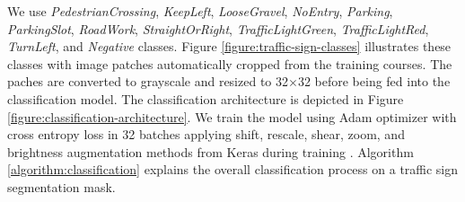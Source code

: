 We use \textit{PedestrianCrossing}, \textit{KeepLeft}, \textit{LooseGravel},
\textit{NoEntry}, \textit{Parking}, \textit{ParkingSlot}, \textit{RoadWork},
\textit{StraightOrRight}, \textit{TrafficLightGreen}, \textit{TrafficLightRed},
\textit{TurnLeft}, and \textit{Negative} classes. Figure
\ref{figure:traffic-sign-classes} illustrates these classes with image patches
automatically cropped from the training courses. The paches are converted to
grayscale and resized to 32$\times$32 before being fed into the classification
model. The classification architecture is depicted in Figure
\ref{figure:classification-architecture}. We train the model using Adam
optimizer with cross entropy loss in 32 batches applying shift, rescale, shear,
zoom, and brightness augmentation methods from Keras during
training \cite{Abadi2015TF, Chollet2015Keras}. Algorithm
\ref{algorithm:classification} explains the overall classification process on a
traffic sign segmentation mask.

